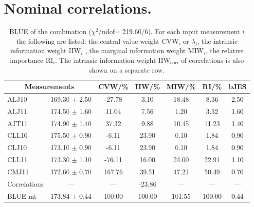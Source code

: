 \section{Nominal correlations.}
\begin{table}[H]
\scriptsize
\begin{center}
\renewcommand{\arraystretch}{1.1}
\begin{tabular}{|lc|c|c|c|c|c|}
\hline
\multicolumn{2}{|c|}{Measurements} & CVW/\%  & IIW/\%  & MIW/\%  & RI/\%  & {\tiny bJES}\\
\hline
ALJ10 &     169.30 $\pm$       2.50 &     -27.78 &       3.10 &      18.48 &       8.36 &       2.50\\
ALJ11 &     174.50 $\pm$       1.60 &      11.04 &       7.56 &       1.20 &       3.32 &       1.60\\
AJT11 &     174.90 $\pm$       1.40 &      37.32 &       9.88 &      10.45 &      11.23 &       1.40\\
CLL10 &     175.50 $\pm$       0.90 &      -6.11 &      23.90 &       0.10 &       1.84 &       0.90\\
CLJ10 &     173.10 $\pm$       0.90 &      -6.11 &      23.90 &       0.10 &       1.84 &       0.90\\
CLL11 &     173.30 $\pm$       1.10 &     -76.11 &      16.00 &      24.00 &      22.91 &       1.10\\
CMJ11 &     172.60 $\pm$       0.70 &     167.76 &      39.51 &      47.21 &      50.49 &       0.70\\
Correlations & --- & --- &     -23.86 & --- & --- & ---\\
\hline
BLUE {\tiny mt} &     173.84 $\pm$       0.44 &     100.00 &     100.00 &     101.55 &     100.00 &       0.44\\
\hline
\end{tabular}
\caption{BLUE of the combination ($\chi^2$/ndof=    219.60/6).
 For each input measurement $i$ the following are listed: the central value weight CVW$_i$ or $\lambda_i$, the intrinsic information weight IIW$_i$ , the marginal information weight MIW$_i$, the relative importance RI$_i$. The intrinsic information weight IIW$_{\mathrm{corr}}$ of correlations is also shown on a separate row.}
\renewcommand{\arraystretch}{1}
\end{center}
\end{table}
